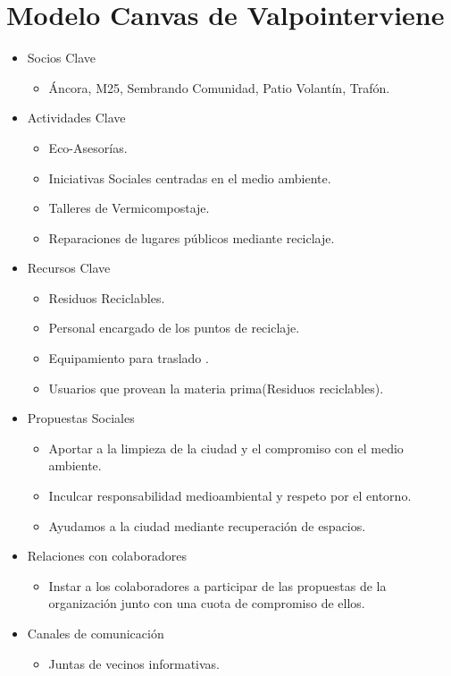 \documentclass[paper=letter, fontsize=11pt]{scrartcl} %
\numberwithin{equation}{section} %
\numberwithin{figure}{section} %
\numberwithin{table}{section} %
\begin{document}
\section*{Modelo Canvas de Valpointerviene}
\begin{itemize}
\item Socios Clave 
\begin{itemize}
\item Áncora, M25, Sembrando Comunidad, Patio Volantín, Trafón.
\end{itemize}
\item Actividades Clave
\begin{itemize}
\item Eco-Asesorías.
\item Iniciativas Sociales centradas en el medio ambiente.
\item Talleres de Vermicompostaje.
\item Reparaciones de lugares públicos mediante reciclaje.
\end{itemize}
\item Recursos Clave
\begin{itemize}
\item Residuos Reciclables.
\item Personal encargado de los puntos de reciclaje.
\item Equipamiento para traslado .
\item Usuarios que provean la materia prima(Residuos reciclables).
\end{itemize}
\item Propuestas Sociales
\begin{itemize}
\item Aportar a la limpieza de la ciudad y el compromiso con el medio ambiente.
\item Inculcar responsabilidad medioambiental y respeto por el entorno.
\item Ayudamos a la ciudad mediante recuperación de espacios.
\end{itemize}
\item Relaciones con colaboradores
\begin{itemize}
\item Instar a los colaboradores a participar de las propuestas de la organización junto con una cuota de compromiso de ellos.
\end{itemize}
\item Canales de comunicación
\begin{itemize}
\item Juntas de vecinos informativas.

\end{itemize}
\end{itemize}
\end{document}
